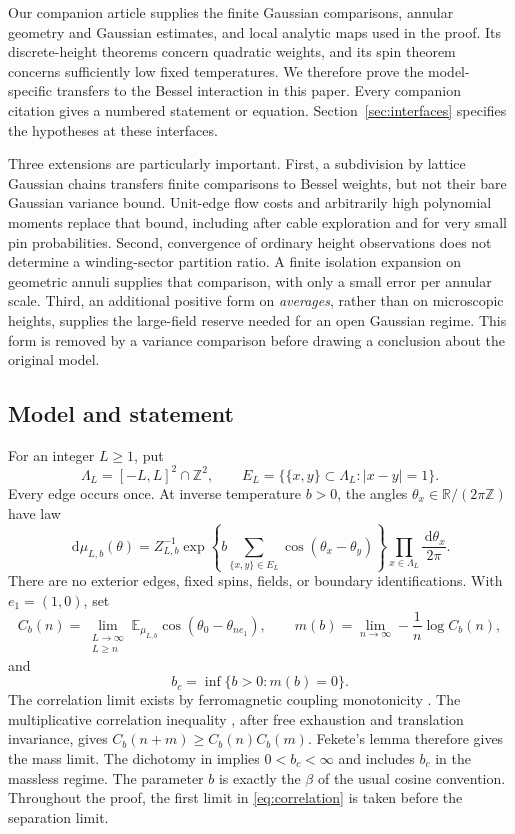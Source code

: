 \documentclass[11pt]{article}
\numberwithin{equation}{section}
\theoremstyle{definition}
\theoremstyle{remark}
\newcommand{\R}{\mathbb R}
\newcommand{\Z}{\mathbb Z}
\newcommand{\E}{\mathbb E}
\newcommand{\dd}{\,\mathrm d}
\begin{document}
Our companion article \cite{BKT} supplies the finite Gaussian
comparisons, annular geometry and Gaussian estimates, and local
analytic maps used in the proof. Its discrete-height theorems
concern quadratic weights, and its spin theorem concerns
sufficiently low fixed temperatures. We therefore prove the
model-specific transfers to the Bessel interaction in this paper.
Every companion citation gives a numbered statement or equation.
Section~\ref{sec:interfaces}
specifies the hypotheses at these interfaces.

Three extensions are particularly important. First, a subdivision
by lattice Gaussian chains transfers finite comparisons to Bessel
weights, but not their bare Gaussian variance bound. Unit-edge
flow costs and arbitrarily high polynomial moments replace that
bound, including after cable exploration and for very small pin
probabilities. Second, convergence of ordinary height observations
does not determine a winding-sector partition ratio. A finite
isolation expansion on geometric annuli supplies that comparison,
with only a small error per annular scale. Third, an additional
positive form on \emph{averages}, rather than on microscopic
heights, supplies the large-field reserve needed for an open
Gaussian regime. This form is removed by a variance comparison
before drawing a conclusion about the original model.

\subsection{Model and statement}
For an integer \(L\ge1\), put
\[
 \Lambda_L=[-L,L]^2\cap\Z^2,
 \qquad
 E_L=\{\{x,y\}\subset\Lambda_L:|x-y|=1\}.
\]
Every edge occurs once. At inverse temperature \(b>0\), the angles
\(\theta_x\in\R/(2\pi\Z)\) have law
\begin{equation}\label{eq:xy-law}
 \dd\mu_{L,b}(\theta)
 =Z_{L,b}^{-1}
   \exp\!\left\{b\sum_{\{x,y\}\in E_L}
                 \cos(\theta_x-\theta_y)\right\}
   \prod_{x\in\Lambda_L}\frac{\dd\theta_x}{2\pi}.
\end{equation}
There are no exterior edges, fixed spins, fields, or boundary
identifications. With \(e_1=(1,0)\), set
\begin{equation}\label{eq:correlation}
 C_b(n)=\lim_{\substack{L\to\infty\\L\ge n}}
  \E_{\mu_{L,b}}\cos(\theta_0-\theta_{ne_1}),\qquad
 m(b)=\lim_{n\to\infty}-\frac1n\log C_b(n),
\end{equation}
and
\begin{equation}\label{eq:critical-definition}
 b_c=\inf\{b>0:m(b)=0\}.
\end{equation}
The correlation limit exists by ferromagnetic coupling
monotonicity \cite{Ginibre1970}. The multiplicative correlation
inequality \cite[arXiv version~2, Lemma~19]{vEL}, after free exhaustion and
translation invariance, gives
\(C_b(n+m)\ge C_b(n)C_b(m)\). Fekete's lemma therefore gives
the mass limit. The dichotomy in \cite[Theorem~1]{vEL} implies
\(0<b_c<\infty\) and includes \(b_c\) in the massless regime.
The parameter \(b\) is exactly
the \(\beta\) of the usual cosine convention. Throughout the proof,
the first limit in \eqref{eq:correlation} is taken before the
separation limit.
\end{document}
